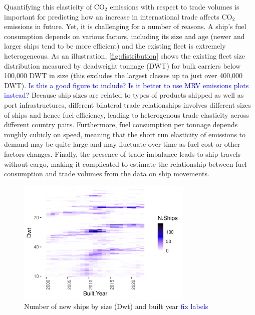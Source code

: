 \documentclass[hidelinks, 12pt,letterpaper]{article}
\begin{document}
Quantifying this elasticity of CO$_2$ emissions with respect to trade volumes is important for predicting how an increase in international trade affects CO$_2$ emissions in future. Yet, it is challenging for a number of reasons. A ship's fuel consumption depends on various factors, including its size and age (newer and larger ships tend to be more efficient) and the existing fleet is extremely heterogeneous. As an illustration, \autoref{fig:distribution} shows the existing fleet size distribution measured by deadweight tonnage (DWT) for bulk carriers below 100,000 DWT in size (this excludes the largest classes up to just over 400,000 DWT). \textcolor{blue}{Is this a good figure to include? Is it better to use MRV emissions plots instead?}  Because ship sizes are related to types of products shipped as well as port infrastructures, different bilateral trade relationships involves different sizes of ships  and hence  fuel efficiency, leading to heterogenous trade elasticity across different country pairs.  Furthermore, fuel consumption per tonnage depends roughly cubicly on speed, meaning that the short run elasticity of emissions to demand may be quite large and may fluctuate over time as fuel cost or other factors changes. Finally, the presence of trade imbalance leads to ship travels without cargo, making it complicated to estimate the relationship between fuel consumption and trade volumes from the data on ship movements.


\begin{figure}[h]
  \centering
  \includegraphics[width = 0.75\textwidth]{WFR_Bulkers_Exploration_Size_Built_heatmap.png}
  \caption{Number of new ships by size (Dwt) and built year \textcolor{blue}{fix labels}
}
  \label{fig:distribution}
\end{figure}
\end{document}

